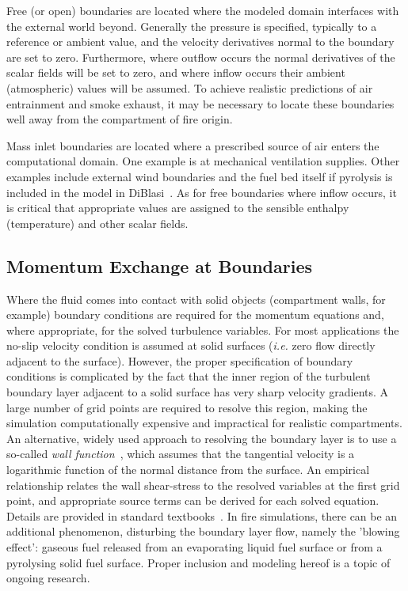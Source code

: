 \documentclass[graybox]{svmult}
\begin{document}
Free (or open) boundaries are located where the modeled domain interfaces with the external world beyond. Generally the pressure is specified, typically to a reference or ambient value, and the velocity derivatives normal to the boundary are set to zero. Furthermore, where outflow occurs the normal derivatives of the scalar fields will be set to zero, and where inflow occurs their ambient (atmospheric) values will be assumed. To achieve realistic predictions of air entrainment and smoke exhaust, it may be necessary to locate these boundaries well away from the compartment of fire origin.

Mass inlet boundaries are located where a prescribed source of air enters the computational domain. One example is at mechanical ventilation supplies. Other examples include external wind boundaries and the fuel bed itself if pyrolysis is included in the model in DiBlasi~\cite{DiBlasi}. As for free boundaries where inflow occurs, it is critical that appropriate values are assigned to the sensible enthalpy (temperature) and other scalar fields.

\subsection{Momentum Exchange at Boundaries}

Where the fluid comes into contact with solid objects (compartment walls, for example) boundary conditions are required for the momentum equations and, where appropriate, for the solved turbulence variables. For most applications  the  no-slip  velocity  condition  is  assumed at solid surfaces ({\em i.e.} zero flow directly adjacent to the surface). However, the proper specification of boundary conditions is complicated by the fact that the inner region of the turbulent boundary layer adjacent to a solid surface has very sharp velocity gradients. A large number of grid points are required to resolve this region, making the simulation computationally expensive and impractical for realistic compartments. An alternative, widely used approach to resolving the boundary layer is to use a so-called {\em wall function}~\cite{Launder}, which assumes that the tangential velocity is a logarithmic function of the normal distance from the surface. An empirical relationship relates the wall shear-stress to the resolved variables at the first grid point, and appropriate source terms can be derived for each solved equation. Details are provided in standard textbooks~\cite{Wilcox}. In fire simulations, there can be an additional phenomenon, disturbing the boundary layer flow, namely the 'blowing effect': gaseous fuel released from an evaporating liquid fuel surface or from a pyrolysing solid fuel surface. Proper inclusion and modeling hereof is a topic of ongoing research.  
\end{document}
